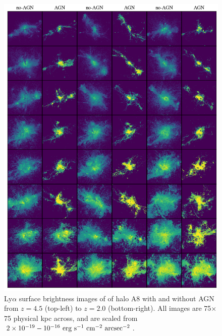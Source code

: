 \begin{figure}
    \centering
    \includegraphics[width=\textwidth,keepaspectratio]{figures/agn_rogues_A8.png}
    \caption{
        Ly$\alpha$ surface brightness images of of halo A8 with and without AGN from $z=4.5$ (top-left) to $z=2.0$ (bottom-right).
        All images are 75$\times$75 physical kpc across, and are scaled from $2\times10^{-19}-10^{-16}\ \rm{erg}\ \rm{s}^{-1}\ \rm{cm}^{-2}\ \rm{arcsec}^{-2}$.
    }
  \label{fig:agn_rogues8}
\end{figure}

